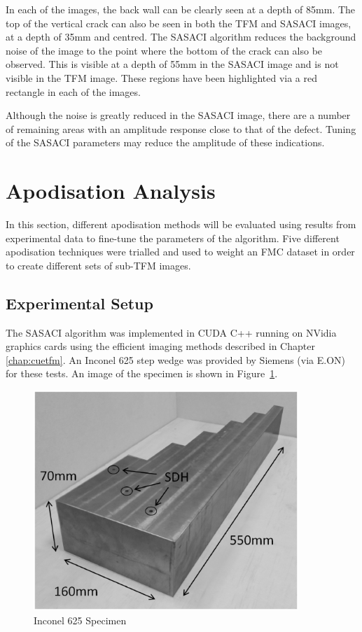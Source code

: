 In each of the images, the back wall can be clearly seen at a depth of 85mm. The top of the vertical crack can also be seen in both the TFM and SASACI images, at a depth of 35mm and centred. The SASACI algorithm reduces the background noise of the image to the point where the bottom of the crack can also be observed. This is visible at a depth of 55mm in the SASACI image and is not visible in the TFM image. These regions have been highlighted via a red rectangle in each of the images.

Although the noise is greatly reduced in the SASACI image, there are a number of remaining areas with an amplitude response close to that of the defect. Tuning of the SASACI parameters may reduce the amplitude of these indications.

\section{Apodisation Analysis}\label{sec:sasaci_weight}

In this section, different apodisation methods will be evaluated using results from experimental data to fine-tune the parameters of the algorithm. Five different apodisation techniques were trialled and used to weight an FMC dataset in order to create different sets of sub-TFM images. 

\subsection{Experimental Setup}\label{sec:sasaci_siemens}

The SASACI algorithm was implemented in CUDA C++ running on NVidia graphics cards using the efficient imaging methods described in Chapter \ref{chap:cuetfm}. An Inconel 625 step wedge was provided by Siemens (via E.ON) for these tests. An image of the specimen is shown in Figure~\ref{fig:step_wedge}.

\begin{figure}[htbp]
\centering
		\includegraphics[width=100mm]{StepWedge.eps}
		\caption{Inconel 625 Specimen}
		\label{fig:step_wedge}
\end{figure}

